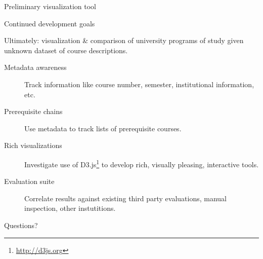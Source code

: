 \documentclass{beamer}
\begin{document}
  \begin{frame}{Preliminary visualization tool}





  \end{frame}

  \begin{frame}{Continued development goals}

    Ultimately: visualization \& comparison of university programs of study
    given unknown dataset of course descriptions.

    \begin{description}
      \item[Metadata awareness] Track information like course number,
      semester, institutional information, etc.
      \item[Prerequisite chains] Use metadata to track lists of
      prerequisite courses.
      \item[Rich visualizations] Investigate use of
      D3.js\footnote{\url{http://d3js.org}} to develop rich, visually
      pleasing, interactive tools.
      \item[Evaluation suite] Correlate results against existing third
      party evaluations, manual inspection, other instutitions.
    \end{description}

  \end{frame}

  \begin{frame}
  \begin{center}
  \Huge Questions?
  \end{center}
  \end{frame}
\end{document}
